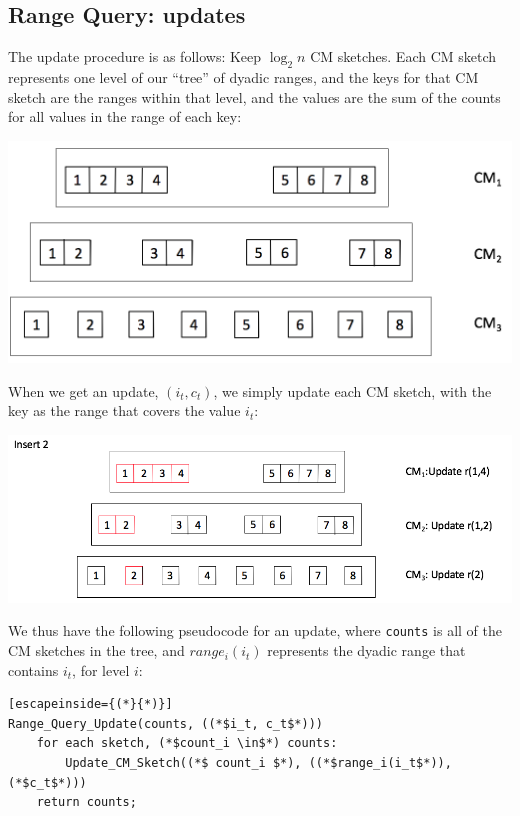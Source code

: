 \documentclass[11pt]{article}
\begin{document}
{\subsection{Range Query: updates}
The update procedure is as follows: Keep $\log_2n$ CM sketches. Each CM sketch
represents one level of our ``tree'' of dyadic ranges, and the keys for that CM
sketch are the ranges within that level, and the values are the sum of the counts for all
values in the range of each key:
\begin{center}\includegraphics[scale=0.3]{dyadic_ranges_cm.png}\end{center}
When we get an update, $(i_t, c_t)$, we simply update each CM sketch, with the
key as the range that covers the value $i_t$:
\begin{center}\includegraphics[scale=0.3]{range_update.png}\end{center}
We thus have the following pseudocode for an update, where \texttt{counts} is
all of the CM sketches in the tree, and $range_i(i_t)$ represents the dyadic
range that contains $i_t$, for level $i$:
\begin{lstlisting}[escapeinside={(*}{*)}]
Range_Query_Update(counts, ((*$i_t, c_t$*)))
    for each sketch, (*$count_i \in$*) counts:
        Update_CM_Sketch((*$ count_i $*), ((*$range_i(i_t$*)), (*$c_t$*)))
    return counts;
\end{lstlisting}
}
\end{document}
